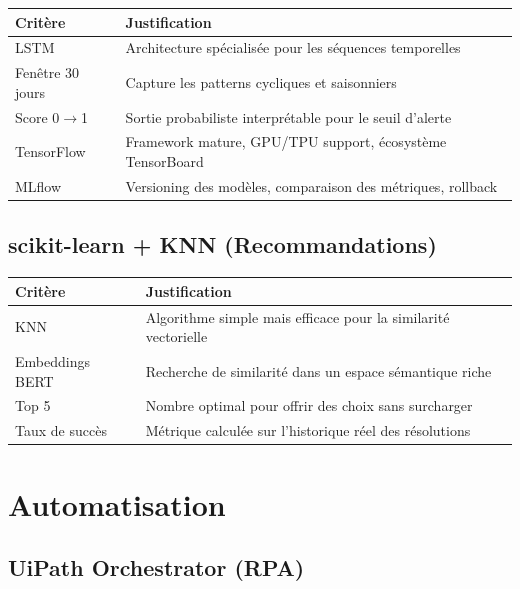 \documentclass[12pt,a4paper]{report}
\begin{document}
\begin{table}[H]
\centering
\begin{tabularx}{\textwidth}{|l|X|}
\hline
\textbf{Critère} & \textbf{Justification} \\
\hline
LSTM & Architecture spécialisée pour les séquences temporelles \\
\hline
Fenêtre 30 jours & Capture les patterns cycliques et saisonniers \\
\hline
Score 0$\rightarrow$1 & Sortie probabiliste interprétable pour le seuil d'alerte \\
\hline
TensorFlow & Framework mature, GPU/TPU support, écosystème TensorBoard \\
\hline
MLflow & Versioning des modèles, comparaison des métriques, rollback \\
\hline
\end{tabularx}
\end{table}

\subsection{scikit-learn + KNN (Recommandations)}

\begin{table}[H]
\centering
\begin{tabularx}{\textwidth}{|l|X|}
\hline
\textbf{Critère} & \textbf{Justification} \\
\hline
KNN & Algorithme simple mais efficace pour la similarité vectorielle \\
\hline
Embeddings BERT & Recherche de similarité dans un espace sémantique riche \\
\hline
Top 5 & Nombre optimal pour offrir des choix sans surcharger \\
\hline
Taux de succès & Métrique calculée sur l'historique réel des résolutions \\
\hline
\end{tabularx}
\end{table}

\section{Automatisation}

\subsection{UiPath Orchestrator (RPA)}
\end{document}
